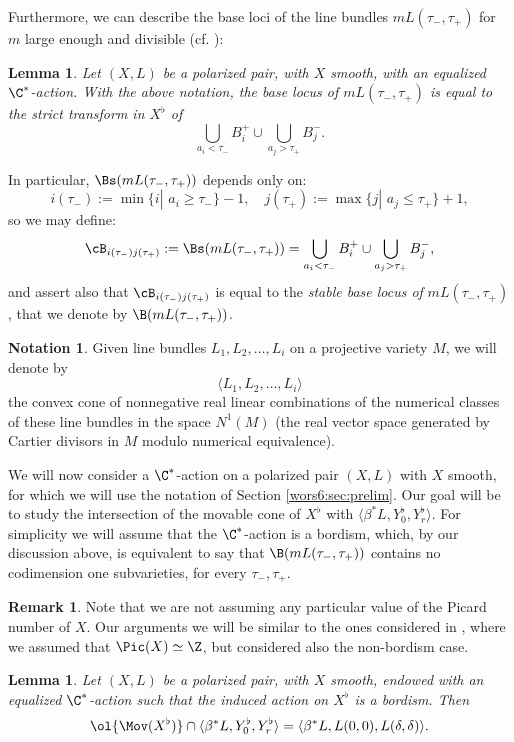 \documentclass[reqno]{amsproc}
\newtheorem{lemma}[theorem]{Lemma}
\theoremstyle{definition}
\newtheorem{notation}[theorem]{Notation}
\newtheorem{remark}[theorem]{Remark}
\begin{document}
Furthermore, we can describe the base loci of the line bundles  $mL(\tau_-,\tau_+)$ for $m$ large enough and divisible (cf. \cite[Corollary~2.7]{wors6-WORS3}):
\begin{lemma}\label{wors6:lem:baselocus}
Let $(X,L)$ be a polarized pair, with $X$ smooth,  with an equalized $\C^*$-action. With the above notation, the base locus of $mL(\tau_-,\tau_+)$ is equal to the strict transform in $X^\flat$ of 
\[
\bigcup_{a_i< \tau_-}B^+_i\cup\bigcup_{a_j> \tau_+}B^-_j.
\]
\end{lemma}
In particular, $\Bs(mL(\tau_-,\tau_+))$ depends only on:
$$
i(\tau_-):=\min\{i|\,\,a_i\geq\tau_-\}-1,\quad j(\tau_+):=\max\{j|\,\,a_j\leq\tau_+\}+1,
$$
so we may define:
\[
\cB_{i(\tau_-)j(\tau_+)}:=\Bs(mL(\tau_-,\tau_+))=\bigcup_{a_i< \tau_-}B^+_i\cup\bigcup_{a_j> \tau_+}B^-_j,
\]
and assert also that $\cB_{i(\tau_-)j(\tau_+)}$ is equal to the {\em stable base locus of }$mL(\tau_-,\tau_+)$, that we denote by $\B(mL(\tau_-,\tau_+))$. 


\begin{notation}\label{wors6:not:cones}
Given line bundles $L_1,L_2,\ldots, L_i$ on a projective variety $M$, we will denote by $$\langle L_1,L_2,\dots, L_i\rangle$$ the convex cone of nonnegative real linear combinations of the numerical classes of these line bundles in the space $N^1(M)$ (the real vector space generated by Cartier divisors in $M$ modulo numerical equivalence). 
\end{notation}

We will now consider a $\C^*$-action on a polarized pair $(X,L)$ with $X$ smooth, for which we will use the notation of Section \ref{wors6:sec:prelim}. Our goal will be to study the intersection of the movable cone of $X^\flat$ with $\langle \beta^*L,Y^\flat_0,Y^\flat_r\rangle$. For simplicity we will assume that the $\C^*$-action is a bordism, which, by our discussion above, is equivalent to say that $\B(mL(\tau_-,\tau_+))$ contains no codimension one subvarieties, for every $\tau_-,\tau_+$.

\begin{remark}\label{wors6:rem:picz}
Note that we are not assuming any particular value of the Picard number of $X$. Our arguments we will be similar to the ones considered in \cite{wors6-WORS3}, where we assumed that $\Pic(X)\simeq \Z$, but considered also the non-bordism case. 
\end{remark}
 
\begin{lemma}\label{wors6:lem:movcone} Let $(X,L)$ be a polarized pair, with $X$ smooth, endowed with an equalized $\C^*$-action such that the induced action on
$X^\flat$ is a bordism. Then
\[\ol{\Mov(X^\flat)}\cap \langle \beta^* L,Y^\flat_0,Y^\flat_r\rangle= \langle \beta^*L,L(0,0),L(\delta,\delta) \rangle.\]
\end{lemma}
\end{document}
